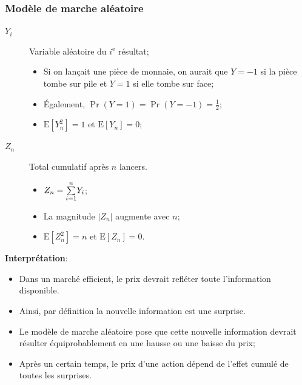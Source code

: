 \documentclass[10pt, french]{article}
\begin{document}
\begin{multicols*}{2}
\subsubsection{Modèle de marche aléatoire}
\begin{distributions}[Notation]
\begin{description}
	\item[$Y_{i}$]	Variable aléatoire du $i^{\text{e}}$ résultat;
		\begin{itemize}
		\item	Si on lançait une pièce de monnaie, on aurait que $Y = -1$ si la pièce tombe sur pile et $Y	=	1$ si elle tombe sur face;
		\item	Également, $\Pr(Y	=	1)	=	\Pr(Y	=	-1)	=	\frac{1}{2}$;
		\item	$\text{E}[Y_{n}^{2}]	=	1$ et $\text{E}[Y_{n}]	=	0$;
		\end{itemize}
	\item[$Z_{n}$]	Total cumulatif après $n$ lancers.
		\begin{itemize}
		\item	$Z_{n}	=	\overset{n}{\underset{i	=	1}{\sum}}Y_{i}$;
		\item	La magnitude $|Z_{n}|$ augmente avec $n$;
		\item	$\text{E}[Z_{n}^{2}]	=	n$ et $\text{E}[Z_{n}]	=	0$.
		\end{itemize}
\end{description}	
\end{distributions}

\textbf{Interprétation}:
\begin{itemize}
	\item	Dans un marché efficient, le prix devrait refléter toute l'information disponible. 		
	\item	Ainsi, par définition la nouvelle information est une surprise.
	\item	Le modèle de marche aléatoire pose que cette nouvelle information devrait résulter équiprobablement en une hausse ou une baisse du prix;
	\item	Après un certain temps, le prix d'une action dépend de l'effet cumulé de toutes les surprises.
\end{itemize}


\end{multicols*}
\end{document}
